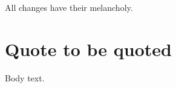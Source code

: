 \documentclass{report}
\begin{document}
\begin{savequote}[8cm]
All changes have their melancholy.
\end{savequote}
\chapter{Quote to be quoted}
Body text.
\end{document}
